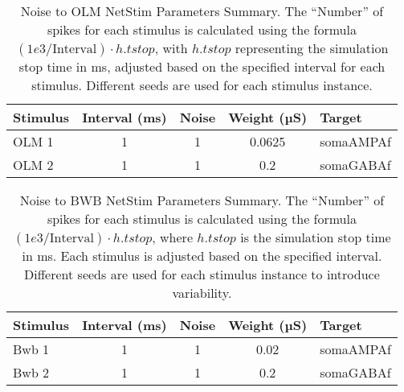 \begin{table}[htbp]
    \centering
    \caption[Noise to OLM Parameters]{Noise to OLM NetStim Parameters Summary.
        The ``Number'' of spikes for each stimulus is calculated using the formula \((1e3 / \text{Interval}) \cdot h.tstop\),
        with \(h.tstop\) representing the simulation stop time in ms,
        adjusted based on the specified interval for each stimulus.
        Different seeds are used for each stimulus instance.}
    \begin{tabular}{lcccl}
        \hline
        \textbf{Stimulus} & \textbf{Interval (ms)} & \textbf{Noise} & \textbf{Weight (µS)} & \textbf{Target} \\
        \hline
        OLM 1             & 1                      & 1              & 0.0625               & somaAMPAf       \\
        OLM 2             & 1                      & 1              & 0.2                  & somaGABAf       \\
        \hline
    \end{tabular}
\end{table}\label{tab:noise_to_OLM}

\begin{table}[htbp]
    \centering
    \caption[Noise to BWB Parameters]{Noise to BWB NetStim Parameters Summary.
        The ``Number'' of spikes for each stimulus is calculated using the formula \((1e3 / \text{Interval}) \cdot h.tstop\),
        where \(h.tstop\) is the simulation stop time in ms. Each stimulus is adjusted based on the specified interval.
        Different seeds are used for each stimulus instance to introduce variability.}
    \begin{tabular}{lcccl}
        \hline
        \textbf{Stimulus} & \textbf{Interval (ms)} & \textbf{Noise} & \textbf{Weight (µS)} & \textbf{Target} \\
        \hline
        Bwb 1             & 1                      & 1              & 0.02                 & somaAMPAf       \\
        Bwb 2             & 1                      & 1              & 0.2                  & somaGABAf       \\
        \hline
    \end{tabular}
\end{table}\label{tab:noise_to_BWB}

